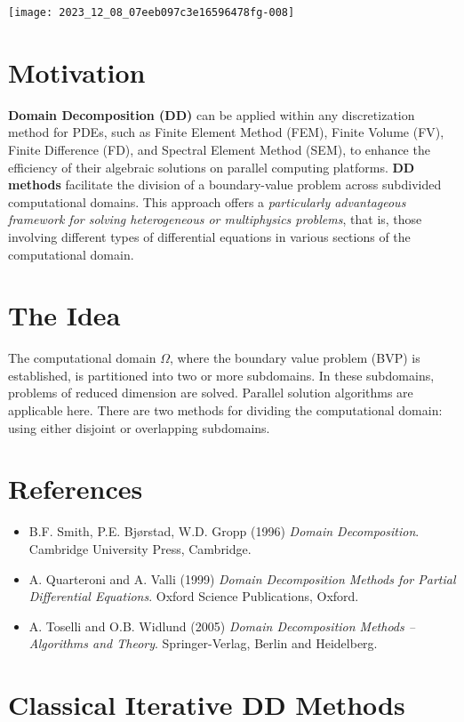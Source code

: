\documentclass[11pt]{book}
\begin{document}
\begin{center}
\texttt{[image: 2023\_12\_08\_07eeb097c3e16596478fg-008]}
\end{center}

\section*{Motivation}
\textbf{Domain Decomposition (DD)} can be applied within any discretization method for PDEs, such as Finite Element Method (FEM), Finite Volume (FV), Finite Difference (FD), and Spectral Element Method (SEM), to enhance the efficiency of their algebraic solutions on parallel computing platforms. \textbf{DD methods} facilitate the division of a boundary-value problem across subdivided computational domains. This approach offers a \textit{particularly advantageous framework for solving heterogeneous or multiphysics problems}, that is, those involving different types of differential equations in various sections of the computational domain.

\section*{The Idea}
The computational domain $\Omega$, where the boundary value problem (BVP) is established, is partitioned into two or more subdomains. In these subdomains, problems of reduced dimension are solved. Parallel solution algorithms are applicable here. There are two methods for dividing the computational domain: using either disjoint or overlapping subdomains.

\section*{References}
\begin{itemize}
    \item B.F. Smith, P.E. Bjørstad, W.D. Gropp (1996) \textit{Domain Decomposition}. Cambridge University Press, Cambridge.
    \item A. Quarteroni and A. Valli (1999) \textit{Domain Decomposition Methods for Partial Differential Equations}. Oxford Science Publications, Oxford.
    \item A. Toselli and O.B. Widlund (2005) \textit{Domain Decomposition Methods – Algorithms and Theory}. Springer-Verlag, Berlin and Heidelberg.
\end{itemize}

\section{Classical Iterative DD Methods}
\end{document}
